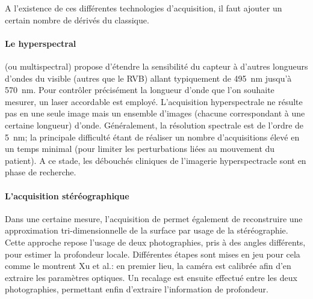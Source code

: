 A l'existence de ces différentes technologies d'acquisition, il faut ajouter un certain nombre de dérivés du \fundus{} classique. 
\paragraph{Le \fundus{} hyperspectral}(ou multispectral) propose d'étendre la sensibilité du capteur à d'autres longueurs d'ondes du visible (autres que le RVB) allant typiquement de \SI{495}{\nano\meter} jusqu'à \SI{570}{\nano\meter}. Pour contrôler précisément la longueur d'onde que l'on souhaite mesurer, un laser accordable est employé. L'acquisition hyperspectrale ne résulte pas en une seule image mais un ensemble d'images (chacune correspondant à une certaine longueur)  d'onde. Généralement, la résolution spectrale est de l'ordre de \SI{5}{\nano\meter}; la principale difficulté étant de réaliser un nombre d'acquisitions élevé en un temps minimal (pour limiter les perturbations liées au mouvement du patient).
A ce stade, les débouchés cliniques de l'imagerie hyperspectracle sont en phase de recherche.
\\
\paragraph{L'acquisition stéréographique}Dans une certaine mesure, l'acquisition de \fundus{} permet également de reconstruire une approximation tri-dimensionnelle de la surface par usage de la stéréographie. Cette approche repose l'usage de deux photographies, pris à des angles différents, pour estimer la profondeur locale. Différentes étapes sont mises en jeu pour cela comme le montrent Xu et al.\cite{xuThreeDimensionalOptic2006}: en premier lieu, la caméra est calibrée afin d'en extraire les paramètres optiques. Un recalage est ensuite effectué entre les deux photographies, permettant enfin d'extraire l'information de profondeur. 

